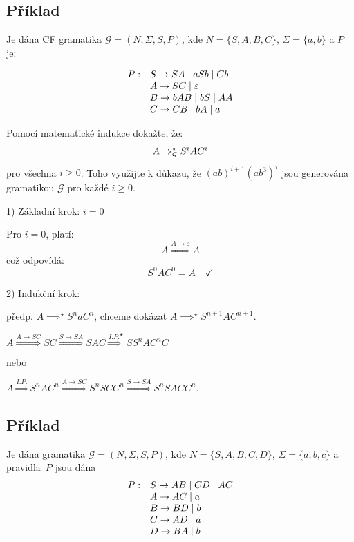 \subsection{Příklad} %
Je dána CF gramatika $\mathcal{G} = (N, \Sigma, S, P)$, kde $N = \{S, A, B, C\}$, $\Sigma = \{a, b\}$ a $P$ je:

\[
\begin{array}{l l}
    P: & S \rightarrow SA \mid aSb \mid Cb \\
       & A \rightarrow SC \mid \varepsilon \\
       & B \rightarrow bAB \mid bS \mid AA \\
       & C \rightarrow CB \mid bA \mid a \\
\end{array}
\]

Pomocí matematické indukce dokažte, že:
\[
A \Rightarrow_{\mathcal{G}}^{\star} S^i A C^i
\]
pro všechna $i \geq 0$. Toho využijte k důkazu, že $(ab)^{i+1}(ab^3)^i$ jsou generována gramatikou $\mathcal{G}$ pro 
každé $i \geq 0$.

1) Základní krok: $i = 0$

Pro $i = 0$, platí:
\[
A \stackrel{A \rightarrow \varepsilon}{\Longrightarrow} A
\]
což odpovídá:
\[
S^0 A C^0 = A \quad \checkmark
\]

2) Indukční krok:

předp. $A \implies^{\star} S^n a C^n$, chceme dokázat $A \implies^{\star} S^{n+1} A C^{n+1}$.

$A \stackrel{A \rightarrow SC}{\Longrightarrow} SC \stackrel{S \rightarrow SA}{\Longrightarrow} SAC \stackrel{I.P.}
{\Longrightarrow}^{\star} SS^nAC^nC$

nebo

$A \stackrel{I.P.}{\Longrightarrow} S^n A C^n \stackrel{A \rightarrow SC}{\Longrightarrow} S^nSCC^n \stackrel
{S \rightarrow SA}{\Longrightarrow} S^nSACC^n$.



\subsection{Příklad} %
Je dána gramatika $\mathcal{G} = (N, \Sigma, S, P )$, kde $N = \{S, A, B, C, D\}$, $\Sigma = \{a, b, c\}$ a
pravidla~$P$ jsou dána
\[
\begin{array}{l l}
    P: & S \rightarrow AB \mid CD \mid AC\\
    & A \rightarrow AC \mid a \\
    & B \rightarrow BD \mid b \\
    & C \rightarrow AD \mid a \\
    & D \rightarrow BA \mid b \\ 
\end{array}
\]


